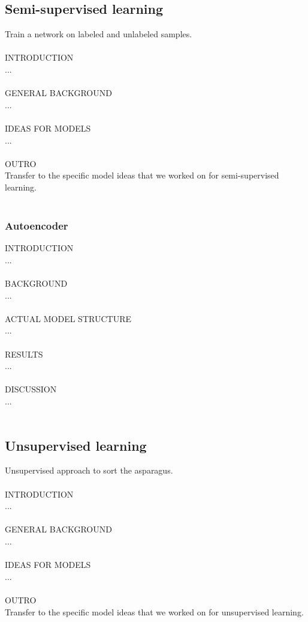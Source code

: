 \subsection{Semi-supervised learning}

Train a network on labeled and unlabeled samples. \\
\\
INTRODUCTION \\
... \\
\\
GENERAL BACKGROUND \\
... \\
\\
IDEAS FOR MODELS \\
... \\
\\
OUTRO \\
Transfer to the specific model ideas that we worked on for semi-supervised learning. \\
\\

\subsubsection{Autoencoder}

INTRODUCTION \\
... \\
\\
BACKGROUND \\
... \\
\\
ACTUAL MODEL STRUCTURE \\
... \\
\\
RESULTS \\
... \\
\\
DISCUSSION \\
... \\
\\

\subsection{Unsupervised learning}

Unsupervised approach to sort the asparagus. \\
\\
INTRODUCTION \\
... \\
\\
GENERAL BACKGROUND \\
... \\
\\
IDEAS FOR MODELS \\
... \\
\\
OUTRO \\
Transfer to the specific model ideas that we worked on for unsupervised learning. \\
\\
